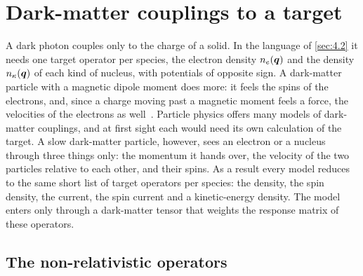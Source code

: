 \section{Dark-matter couplings to a target}\label{sec:8.1}

A dark photon couples only to the charge of a solid. In the language of \cref{sec:4.2} it needs one target operator per species, the electron density $n_e(\bm{q})$ and the density $n_\kappa(\bm{q})$ of each kind of nucleus, with potentials of opposite sign. A dark-matter particle with a magnetic dipole moment does more: it feels the spins of the electrons, and, since a charge moving past a magnetic moment feels a force, the velocities of the electrons as well~\cite[Table~II]{trickle2022effective}. Particle physics offers many models of dark-matter couplings, and at first sight each would need its own calculation of the target. A slow dark-matter particle, however, sees an electron or a nucleus through three things only: the momentum it hands over, the velocity of the two particles relative to each other, and their spins. As a result every model reduces to the same short list of target operators per species: the density, the spin density, the current, the spin current and a kinetic-energy density. The model enters only through a dark-matter tensor that weights the response matrix of these operators.

\subsection{The non-relativistic operators}

